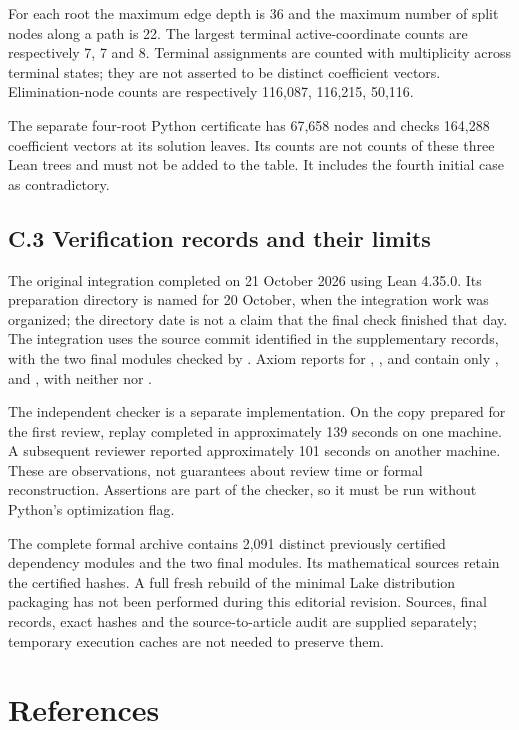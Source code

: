\documentclass[11pt,a4paper]{article}
\begin{document}
For each root the maximum edge depth is 36 and the maximum number of split nodes along a path is 22. The largest terminal active-coordinate counts are respectively 7, 7 and 8. Terminal assignments are counted with multiplicity across terminal states; they are not asserted to be distinct coefficient vectors. Elimination-node counts are respectively 116,087, 116,215, 50,116.

The separate four-root Python certificate has 67,658 nodes and checks 164,288 coefficient vectors at its solution leaves. Its counts are not counts of these three Lean trees and must not be added to the table. It includes the fourth initial case as contradictory.

\subsection*{C.3 Verification records and their limits}

The original integration completed on 21 October 2026 using Lean 4.35.0. Its preparation directory is named for 20 October, when the integration work was organized; the directory date is not a claim that the final check finished that day. The integration uses the source commit identified in the supplementary records, with the two final modules checked by . Axiom reports for , ,  and  contain only ,  and , with neither  nor .

The independent checker is a separate implementation. On the copy prepared for the first review, replay completed in approximately 139 seconds on one machine. A subsequent reviewer reported approximately 101 seconds on another machine. These are observations, not guarantees about review time or formal reconstruction. Assertions are part of the checker, so it must be run without Python's optimization flag.

The complete formal archive contains 2,091 distinct previously certified dependency modules and the two final modules. Its mathematical sources retain the certified hashes. A full fresh rebuild of the minimal Lake distribution packaging has not been performed during this editorial revision. Sources, final records, exact hashes and the source-to-article audit are supplied separately; temporary execution caches are not needed to preserve them.

\clearpage
\section*{References}
\end{document}
